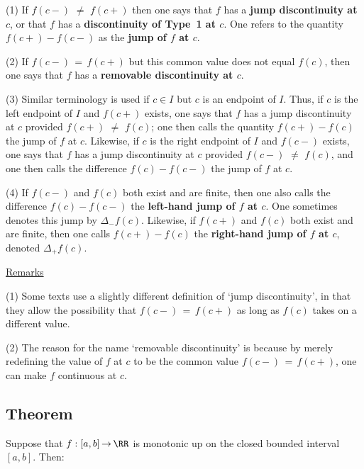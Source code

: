 \V

        (1) If $f(c-) \,\,{\neq}\,\, f(c+)$ then one says that $f$ has a {\bf jump discontinuity at $c$}, or that $f$ has a {\bf discontinuity of Type~1 at $c$}.
    One refers to the quantity $f(c+)-f(c-)$ as the {\bf jump of $f$ at $c$}.

\V

        (2) If $f(c-) \,=\, f(c+)$ but this common value does not equal $f(c)$, then one says that $f$ has a {\bf removable discontinuity at $c$}.

\V

        (3) Similar terminology is used if $c{\in}I$ but $c$ is an endpoint of $I$.
    Thus, if $c$ is the left endpoint of $I$ and $f(c+)$ exists, one says that $f$ has a jump discontinuity at $c$ provided $f(c+) \,\,{\neq}\,\, f(c)$;
    one then calls the quantity $f(c+)-f(c)$ the jump of $f$ at $c$.
    Likewise, if $c$ is the right endpoint of $I$ and $f(c-)$ exists, one says that $f$ has a jump discontinuity at $c$ provided $f(c-) \,\,{\neq}\,\, f(c)$, and one then calls the difference $f(c)-f(c-)$ the jump of $f$ at $c$.

\V

        (4) If $f(c-)$ and $f(c)$ both exist and are finite, then one also calls the difference $f(c)-f(c-)$ the {\bf left-hand jump of $f$ at $c$}.
    One sometimes denotes this jump by ${\Delta}_{-}f(c)$.
    Likewise, if $f(c+)$ and $f(c)$ both exist and are finite, then one calls $f(c+)-f(c)$ the {\bf right-hand jump of $f$ at $c$}, denoted ${\Delta}_{+} f(c)$.


        \underline{Remarks}

\V

        (1) Some texts use a slightly different definition of `jump discontinuity',
    in that they allow the possibility that $f(c-) \,=\, f(c+)$ as long as $f(c)$ takes on a different value.

\V

        (2) The reason for the name `removable discontinuity' is because by merely redefining the value of $f$ at $c$ to be the common value $f(c-) \,=\, f(c+)$, one can make $f$ continuous at $c$.

\V
\V

             \subsection{\small{\bf Theorem}}
            \label{ThmF40.70}

        Suppose that $f:[a,b] \,{\rightarrow}\, {\RR}$ is monotonic up on the closed bounded interval $[a,b]$.
    Then:

